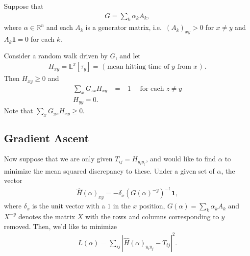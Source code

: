 \documentclass{article}
\newcommand{\R}{\mathbb{R}}
\newcommand{\E}{\mathbb{E}}
\newcommand{\bone}{\mathbf{1}}
\begin{document}
Suppose that 
\begin{align}
  G = \sum_k \alpha_k A_k,
\end{align}
where $\alpha \in \R^n$
and each $A_k$ is a generator matrix,
i.e.\ $(A_k)_{xy} > 0$ for $x\neq y$ and $A_k \bone = 0$ for each $k$.

Consider a random walk driven by $G$, and let
\begin{align}
  H_{xy} = \E^x[\tau_y] = \text{ ( mean hitting time of $y$ from $x$ ) } .
\end{align}
Then  $H_{xy} \ge 0$ and
\begin{align}
  \sum_x G_{zx} H_{xy} &= -1 \quad \text{ for each } z \neq y \\
        H_{yy} = 0 .
\end{align}
Note that $\sum_x G_{yx} H_{xy} \ge 0$.

\subsection*{Gradient Ascent}

Now suppose that we are only given $T_{ij} = H_{y_i y_j}$,
and would like to find $\alpha$ to minimize the mean squared discrepancy to these.
Under a given set of $\alpha$, the vector
\begin{align}
  \hat H(\alpha)_{x y} = - \delta_x (G(\alpha)^{-y})^{-1} \bone ,
\end{align}
where $\delta_x$ is the unit vector with a $1$ in the $x$ position,
$G(\alpha) = \sum_k \alpha_k A_k$ 
and $X^{-y}$ denotes the matrix $X$ with the rows and columns corresponding to $y$ removed.
Then, we'd like to minimize
\begin{align}
  L(\alpha) = \sum_{ij} | \hat H(\alpha)_{y_i y_j} - T_{ij} |^2 .
\end{align}
\end{document}
